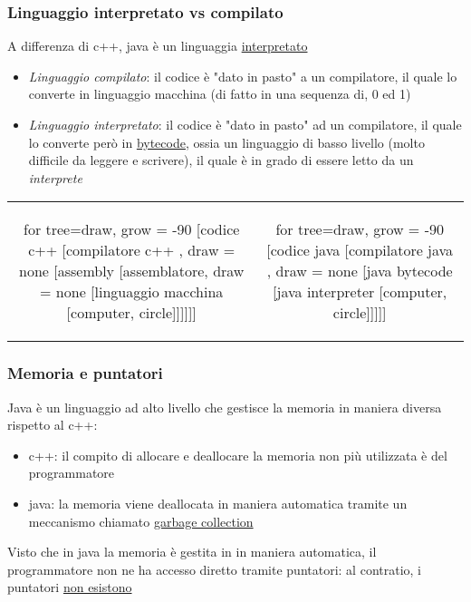 \subsubsection{Linguaggio interpretato vs compilato}
A differenza di c++, java è un linguaggia \underline{interpretato}
\begin{itemize}
	\item \textit{Linguaggio compilato}: il codice è "dato in pasto" a un compilatore, il quale lo converte in linguaggio macchina (di fatto in una sequenza di, 0 ed 1)
	\item \textit{Linguaggio interpretato}: il codice è "dato in pasto" ad un compilatore, il quale lo converte però in \underline{bytecode}, ossia un linguaggio di basso livello (molto difficile da leggere e scrivere), il quale è in grado di essere letto da un \textit{interprete}
\end{itemize}

\begin{center}
	\begin{tabular}{c c}
		\begin{forest}
			for tree={draw, grow = -90}
			[codice c++ [compilatore c++ , draw = none [assembly [assemblatore, draw = none [linguaggio macchina [computer, circle]]]]]]
		\end{forest}
		 &
		\begin{forest}
			for tree={draw, grow = -90}
			[codice java [compilatore java , draw = none [java bytecode [java interpreter [computer, circle]]]]]
		\end{forest}
	\end{tabular}
\end{center}
\subsubsection{Memoria e puntatori}
Java è un linguaggio ad alto livello che gestisce la memoria in maniera diversa rispetto al c++:
\begin{itemize}
	\item c++: il compito di allocare e deallocare la memoria non più utilizzata è del programmatore
	\item java: la memoria viene deallocata in maniera automatica tramite un meccanismo chiamato \underline{garbage collection}
\end{itemize}

Visto che in java la memoria è gestita in in maniera automatica, il programmatore non ne ha accesso diretto tramite puntatori: al contratio, i puntatori \underline{non esistono}

